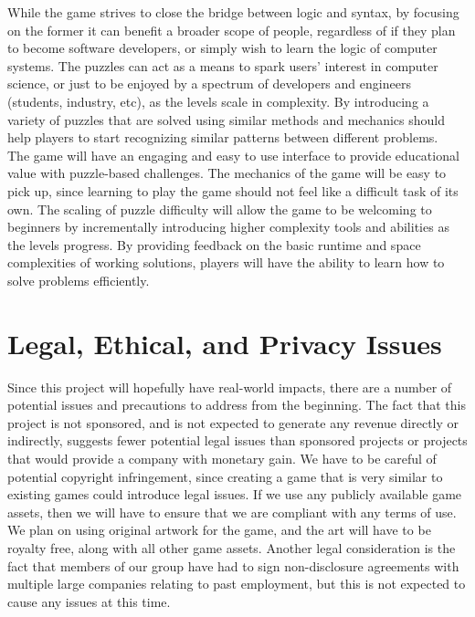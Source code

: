 \documentclass{article}
\begin{document}
While the game strives to close the bridge between logic and syntax, by focusing
on the former it can benefit a broader scope of people, regardless of if they
plan to become software developers, or simply wish to learn the logic of
computer systems. The puzzles can act as a means to spark users’ interest in
computer science, or just to be enjoyed by a spectrum of developers and
engineers (students, industry, etc), as the levels scale in complexity. By
introducing a variety of puzzles that are solved using similar methods and
mechanics should help players to start recognizing similar patterns between
different problems.\\

The game will have an engaging and easy to use interface to provide educational
value with puzzle-based challenges. The mechanics of the game will be easy to
pick up, since learning to play the game should not feel like a difficult task
of its own. The scaling of puzzle difficulty will allow the game to be welcoming
to beginners by incrementally introducing higher complexity tools and abilities
as the levels progress. By providing feedback on the basic runtime and space
complexities of working solutions, players will have the ability to learn how to
solve problems efficiently.\\

\newpage
\section{Legal, Ethical, and Privacy Issues}
Since this project will hopefully have real-world impacts, there are a number of
potential issues and precautions to address from the beginning. The fact that
this project is not sponsored, and is not expected to generate any revenue
directly or indirectly, suggests fewer potential legal issues than sponsored
projects or projects that would provide a company with monetary gain. We have to
be careful of potential copyright infringement, since creating a game that is
very similar to existing games could introduce legal issues. If we use any
publicly available game assets, then we will have to ensure that we are
compliant with any terms of use. We plan on using original artwork for the game,
and the art will have to be royalty free, along with all other game assets.
Another legal consideration is the fact that members of our group have had to
sign non-disclosure agreements with multiple large companies relating to past
employment, but this is not expected to cause any issues at this time.\\
\end{document}

